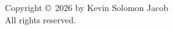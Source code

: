 \thispagestyle{empty}
\vspace*{\fill}
\begin{center}
Copyright \copyright\ 2026 by Kevin Solomon Jacob \\
All rights reserved.
\end{center}
\vspace*{\fill}
\newpage
